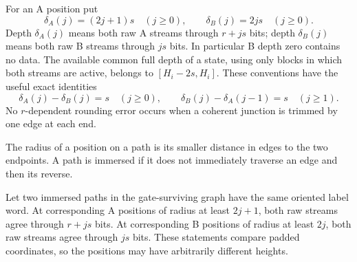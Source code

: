 For an A position put
\begin{equation}\label{eq:aligned-depths}
 \delta_A(j)=(2j+1)s\quad(j\ge0),\qquad
 \delta_B(j)=2js\quad(j\ge0).
\end{equation}
Depth $\delta_A(j)$ means both raw A streams through $r+js$ bits;
depth $\delta_B(j)$ means both raw B streams through $js$ bits.
In particular B depth zero contains no data.  The available common full
depth of a state, using only blocks in which both streams are active,
belongs to $[H_i-2s,H_i]$.  These conventions have the useful exact
identities
\begin{equation}\label{eq:depth-propagation}
 \delta_A(j)-\delta_B(j)=s\quad(j\ge0),
 \qquad \delta_B(j)-\delta_A(j-1)=s\quad(j\ge1).
\end{equation}
No $r$-dependent rounding error occurs when a coherent junction is
trimmed by one edge at each end.

The radius of a position on a path is its smaller distance in edges to
the two endpoints.  A path is immersed if it does not immediately
traverse an edge and then its reverse.

\begin{lemma}\label{lem:tower-recovery}
Let two immersed paths in the gate-surviving graph have the same
oriented label word.  At corresponding A positions of radius at least
$2j+1$, both raw streams agree through $r+js$ bits.  At corresponding B
positions of radius at least $2j$, both raw streams agree through $js$
bits.  These statements compare padded coordinates, so the positions
may have arbitrarily different heights.
\end{lemma}

